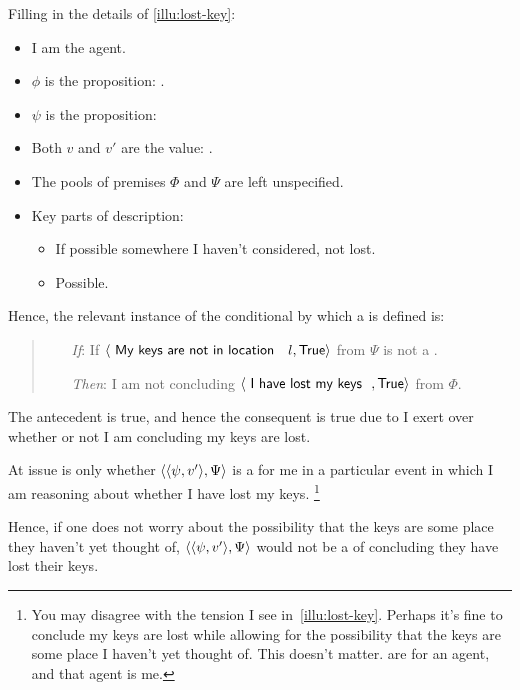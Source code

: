 \begin{note}
  Filling in the details of \autoref{illu:lost-key}:
  \begin{itemize}[noitemsep]
  \item
    I am the agent.
  \item
    \(\phi\) is the proposition: .
  \item
    \(\psi\) is the proposition: 
  \item
    Both \(v\) and \(v'\) are the value: .
  \item
    The pools of premises \(\Phi\) and \(\Psi\) are left unspecified.
  \item
    Key parts of description:
    \begin{itemize}
    \item
      If possible somewhere I haven't considered, not lost.
    \item
      Possible.
    \end{itemize}
  \end{itemize}

  Hence, the relevant instance of the conditional by which a \requ{} is defined is:

  \begin{quote}
    \begin{itemize}
    \item[\emph{If}:]
      If \(\pv{\propI{My keys are not in location }l}{\valI{True}}\) from \(\Psi\) is not a \fc{}.
    \item[\emph{Then}:]
      I am not concluding \(\pv{\propI{I have lost my keys}}{\valI{True}}\) from \(\Phi\).
    \end{itemize}
  \end{quote}

  The antecedent is true, and hence the consequent is true due to \ninf{} I exert over whether or not I am concluding my keys are lost.
\end{note}

\begin{note}
  At issue is only whether \(\langle \langle \psi, v' \rangle, \Psi \rangle\) is a \requ{} for me in a particular event in which I am reasoning about whether I have lost my keys.%
  \footnote{
    You may disagree with the tension I see in~\autoref{illu:lost-key}.
    Perhaps it's fine to conclude my keys are lost while allowing for the possibility that the keys are some place I haven't yet thought of.
    This doesn't matter.
     are for an agent, and that agent is me.
  }

  Hence, if one does not worry about the possibility that the keys are some place they haven't yet thought of, \(\langle \langle \psi, v' \rangle, \Psi \rangle\) would not be a  of concluding they have lost their keys.
\end{note}

